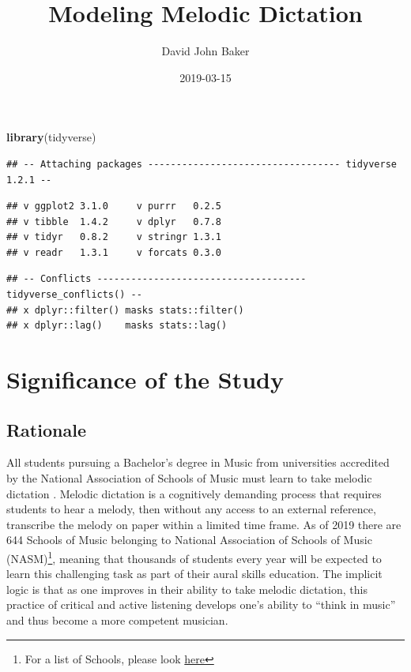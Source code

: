 \documentclass[]{book}
\title{Modeling Melodic Dictation}
\author{David John Baker}
\date{2019-03-15}
\newenvironment{Shaded}{\begin{snugshade}}{\end{snugshade}}
\newcommand{\KeywordTok}[1]{\textcolor[rgb]{0.13,0.29,0.53}{\textbf{#1}}}
\newcommand{\NormalTok}[1]{#1}
\let\rmarkdownfootnote\footnote%
\def\footnote{\protect\rmarkdownfootnote}
\begin{document}
\maketitle

{
\setcounter{tocdepth}{1}
\tableofcontents
}
\begin{Shaded}
\begin{Highlighting}[]
\KeywordTok{library}\NormalTok{(tidyverse)}
\end{Highlighting}
\end{Shaded}

\begin{verbatim}
## -- Attaching packages ---------------------------------- tidyverse 1.2.1 --
\end{verbatim}

\begin{verbatim}
## v ggplot2 3.1.0     v purrr   0.2.5
## v tibble  1.4.2     v dplyr   0.7.8
## v tidyr   0.8.2     v stringr 1.3.1
## v readr   1.3.1     v forcats 0.3.0
\end{verbatim}

\begin{verbatim}
## -- Conflicts ------------------------------------- tidyverse_conflicts() --
## x dplyr::filter() masks stats::filter()
## x dplyr::lag()    masks stats::lag()
\end{verbatim}

\hypertarget{significance-of-the-study}{%
\chapter{Significance of the Study}\label{significance-of-the-study}}

\hypertarget{rationale}{%
\section{Rationale}\label{rationale}}

All students pursuing a Bachelor's degree in Music from universities accredited by the National Association of Schools of Music must learn to take melodic dictation \citep[§VIII.6.B.2.A]{NationalAssociationSchools2018}.
Melodic dictation is a cognitively demanding process that requires students to hear a melody, then without any access to an external reference, transcribe the melody on paper within a limited time frame.
As of 2019 there are 644 Schools of Music belonging to National Association of Schools of Music (NASM)\footnote{For a list of Schools, please look \href{https://nasm.arts-accredit.org/directory-lists/accredited-institutions/search/?institutionname=\&city=\&state=\&country=\&search=true}{here}}, meaning that thousands of students every year will be expected to learn this challenging task as part of their aural skills education.
The implicit logic is that as one improves in their ability to take melodic dictation, this practice of critical and active listening develops one's ability to ``think in music'' \citep{bestMusicCurriculaFuture1992, karpinskiAuralSkillsAcquisition2000} and thus become a more competent musician.
\end{document}
